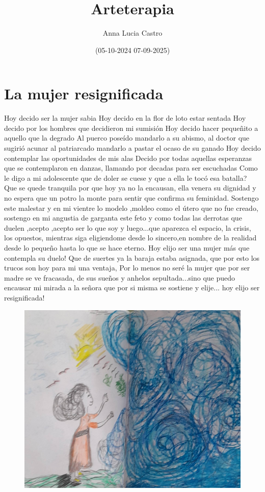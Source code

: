 \documentclass[12pt, a4paper, twoside]{book} %
\author{Anna Lucia Castro}
\title{\textbf{Arteterapia}}
\date{(05-10-2024 07-09-2025)}
\begin{document}
\maketitle
\thispagestyle{empty} %

\tableofcontents

\chapter{La mujer resignificada}

Hoy decido ser la mujer sabia
Hoy decido en la flor de loto estar sentada
Hoy decido por los hombres que decidieron mi sumisión
Hoy decido hacer pequeñito a aquello que la degrado
Al puerco poseído mandarlo a su abismo, al doctor que sugirió acunar al patriarcado mandarlo a pastar el  ocaso de su ganado
Hoy decido contemplar las oportunidades de mis alas
Decido por todas aquellas esperanzas que se contemplaron en danzas, llamando por decadas para  ser escuchadas
Como le digo a mi adolescente que de doler se cuese y que a ella le tocó esa batalla?
Que se quede tranquila por que hoy ya no la encausan, ella venera su dignidad y no espera que un potro la monte para sentir que confirma su feminidad.
Sostengo este malestar y en mi vientre lo modelo ,moldeo como el útero que no fue creado, sostengo en mi angustia de garganta este feto y  como todas las derrotas que duelen ,acepto ,acepto ser lo que soy  y luego...que aparezca el espacio, la crisis, los opuestos, mientras siga eligiendome desde lo sincero,en nombre de la realidad desde lo pequeño hasta lo que se hace eterno.
Hoy elijo ser una mujer más que contempla su duelo! Que de suertes ya la baraja estaba asignada, que por esto los trucos son hoy para mi una ventaja, Por lo menos no seré la mujer que por ser madre se ve fracasada,  de sus sueños y anhelos sepultada...sino que puedo encausar mi mirada a la señora que por si misma se sostiene y elije... hoy elijo  ser resignificada!

\begin{figure}[H]
	\centering
	\includegraphics[width=\textwidth]{./images/1f81324df3940b.jpg}
\end{figure}
\end{document}
